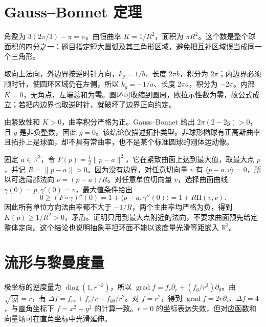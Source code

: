 \documentclass[UTF8,12pt,a4paper,fontset=fandol]{ctexbook}
\newcommand{\R}{\mathbb R}
\newcommand{\ip}[2]{\langle #1,#2\rangle}
\newcommand{\norm}[1]{\lVert #1\rVert}
\DeclareMathOperator{\grad}{grad}
\begin{document}
\section{Gauss--Bonnet 定理}
\begin{solve}
角盈为 $3(2\pi/3)-\pi=\pi$。由恒曲率 $K=1/R^2$，面积为 $\pi R^2$。这个数是整个球面积的四分之一；题目指定短大圆弧及其三角形区域，避免把互补区域误当成同一个三角形。
\end{solve}

\begin{solve}
取向上法向，外边界按逆时针方向，$k_g=1/b$、长度 $2\pi b$，积分为 $2\pi$；内边界必须顺时针，使圆环区域仍在左侧，所以 $k_g=-1/a$、长度 $2\pi a$，积分为 $-2\pi$。内部 $K=0$，无角点，左端总和为零。圆环可收缩到圆周，欧拉示性数为零，故公式成立；若把内边界也取逆时针，就破坏了边界正向约定。
\end{solve}

\begin{solve}
由紧致性和 $K>0$，曲率积分严格为正。Gauss--Bonnet 给出 $2\pi(2-2g)>0$，且 $g$ 是非负整数，因此 $g=0$。该结论仅描述拓扑类型。非球形椭球有正高斯曲率且拓扑上是球面，却不具有常曲率，也不是某个标准圆球的刚体运动像。
\end{solve}

\begin{solve}
固定 $a\in\R^3$，令 $F(p)=\tfrac12\norm{p-a}^2$，它在紧致曲面上达到最大值，取最大点 $p$，并记 $R=\norm{p-a}>0$。因为没有边界，对任意切向量 $v$ 有 $\ip{p-a}v=0$，所以可选局部法向 $\nu=(p-a)/R$。对任意单位切向量 $v$，选择曲面曲线 $\gamma(0)=p,\gamma'(0)=v$，最大值条件给出
\[
 0\ge(F\circ\gamma)''(0)=1+\ip{p-a}{\gamma''(0)}
 =1+R\mathrm{II}(v,v).
\]
因此所有单位方向法曲率都不大于 $-1/R$，两个主曲率均严格为负，得到 $K(p)\ge1/R^2>0$，矛盾。证明只用到最大点附近的法向，不要求曲面预先给定整体定向。这个结论也说明抽象平坦环面不能以该度量光滑等距嵌入 $\R^3$。
\end{solve}

\section{流形与黎曼度量}
\begin{solve}
极坐标的逆度量为 $\operatorname{diag}(1,r^{-2})$，所以 $\grad f=f_r\partial_r+(f_\theta/r^2)\partial_\theta$。由 $\sqrt{|g|}=r$，有 $\Delta f=f_{rr}+f_r/r+f_{\theta\theta}/r^2$。对 $f=r^2$，得到 $\grad f=2r\partial_r$、$\Delta f=4$，与直角坐标下 $f=x^2+y^2$ 的计算一致。$r=0$ 的坐标表达失效，但对应函数和向量场可在直角坐标中光滑延伸。
\end{solve}
\end{document}
